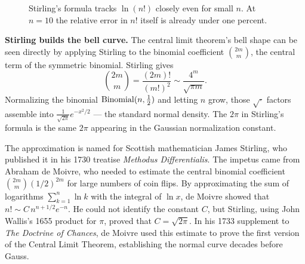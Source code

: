 \begin{figure}[H]
\centering
{}
\caption{Stirling's formula tracks $\ln(n!)$ closely even for small
$n$. At $n=10$ the relative error in $n!$ itself is already under one percent.}
\label{ch39:stirlingfig}
\end{figure}

\begin{applicationbox}
\textbf{Stirling builds the bell curve.} The central limit theorem's bell
shape can be seen directly by applying Stirling to the binomial coefficient
$\binom{2m}{m}$, the central term of the symmetric binomial. Stirling gives
\[
  \binom{2m}{m} = \frac{(2m)!}{(m!)^2} \sim \frac{4^{m}}{\sqrt{\pi m}}.
\]
Normalizing the binomial $\operatorname{Binomial}(n,\tfrac12)$ and letting $n$ grow, those
$\sqrt{\cdot}$ factors assemble into $\frac{1}{\sqrt{2\pi}}e^{-x^2/2}$ --- the
standard normal density. The $2\pi$ in Stirling's formula is the same $2\pi$
appearing in the Gaussian normalization constant.
\end{applicationbox}

\begin{historybox}
The approximation is named for Scottish mathematician James Stirling, who
published it in his 1730 treatise \emph{Methodus Differentialis}. The
impetus came from Abraham de Moivre, who needed to estimate the central
binomial coefficient $\binom{2m}{m}(1/2)^{2m}$ for large numbers of coin
flips. By approximating the sum of logarithms $\sum_{k=1}^n \ln k$ with the
integral of $\ln x$, de Moivre showed that $n! \sim C\,n^{n+1/2}e^{-n}$. He could
not identify the constant $C$, but Stirling, using John Wallis's 1655 product
for $\pi$, proved that $C = \sqrt{2\pi}$. In his 1733 supplement to \emph{The
Doctrine of Chances}, de Moivre used this estimate to prove the first version of
the Central Limit Theorem, establishing the normal curve decades before Gauss.
\end{historybox}

